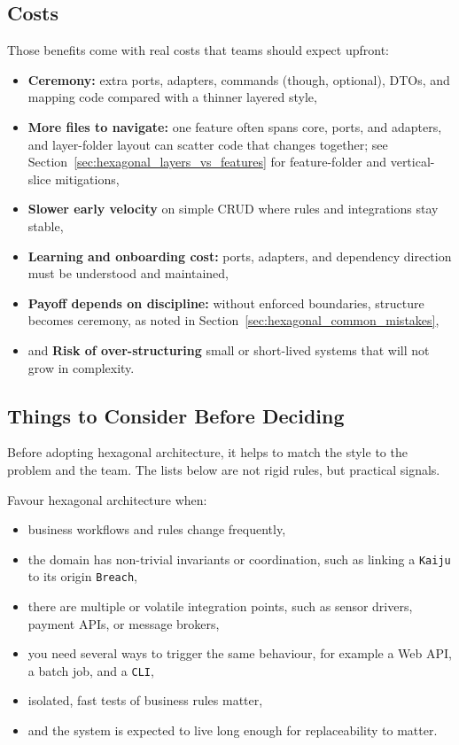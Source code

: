 \subsection{Costs}
\label{sec:hexagonal_cons}

Those benefits come with real costs that teams should expect upfront:
\begin{itemize}
    \item \textbf{Ceremony:} extra ports, adapters, commands (though, optional), DTOs, and mapping code compared with a thinner layered style,
    \item \textbf{More files to navigate:} one feature often spans core, ports, and adapters, and layer-folder layout can scatter code that changes together; see Section~\ref{sec:hexagonal_layers_vs_features} for feature-folder and vertical-slice mitigations,
    \item \textbf{Slower early velocity} on simple CRUD where rules and integrations stay stable,
    \item \textbf{Learning and onboarding cost:} ports, adapters, and dependency direction must be understood and maintained,
    \item \textbf{Payoff depends on discipline:} without enforced boundaries, structure becomes ceremony, as noted in Section~\ref{sec:hexagonal_common_mistakes},
    \item and \textbf{Risk of over-structuring} small or short-lived systems that will not grow in complexity.
\end{itemize}

\subsection{Things to Consider Before Deciding}
\label{sec:hexagonal_when_to_choose}

Before adopting hexagonal architecture, it helps to match the style to the problem and the team. The lists below are not rigid rules, but practical signals.

Favour hexagonal architecture when:
\begin{itemize}
    \item business workflows and rules change frequently,
    \item the domain has non-trivial invariants or coordination, such as linking a \texttt{Kaiju} to its origin \texttt{Breach},
    \item there are multiple or volatile integration points, such as sensor drivers, payment APIs, or message brokers,
    \item you need several ways to trigger the same behaviour, for example a Web API, a batch job, and a \texttt{CLI},
    \item isolated, fast tests of business rules matter,
    \item and the system is expected to live long enough for replaceability to matter.
\end{itemize}

